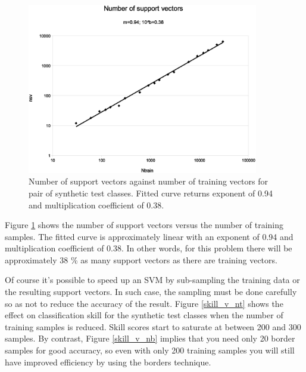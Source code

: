 \begin{figure}
\includegraphics[width=0.9\textwidth]{../nsv}
\caption{Number of support vectors against number of training vectors for pair of synthetic test classes. Fitted curve returns exponent of 0.94 and multiplication coefficient of 0.38.}
\label{nsv}
\end{figure}

Figure \ref{nsv} shows the number of support vectors versus the
number of training samples. The fitted curve is approximately linear 
with an exponent of 0.94 and multiplication coefficient of 0.38.
In other words, for this problem there will be approximately 38 \% as many 
support vectors as there are training vectors.

Of course it's possible to speed up an SVM by sub-sampling the training data
or the resulting support vectors.
In such case, the sampling must be done carefully so as not to reduce the
accuracy of the result.
Figure \ref{skill_v_nt} shows the effect on classification skill for the
synthetic test classes when the number of training samples is reduced.
Skill scores start to saturate at between 200 and 300 samples.
By contrast, Figure \ref{skill_v_nb} implies that you need only 20 border samples
for good accuracy, so even with only 200 training samples you will still
have improved efficiency by using the borders technique.

